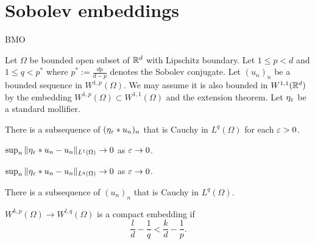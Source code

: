 \documentclass{../note}
\begin{document}
\section{Sobolev embeddings}
\begin{prb}
\end{prb}
\begin{prb}
\end{prb}
\begin{prb}
\end{prb}
\begin{prb} BMO
\end{prb}
\begin{prb}
Let $\Omega$ be bounded open subset of $\mathbb{R}^d$ with Lipschitz boundary.
Let $1\le p<d$ and $1\le q<p^*$ where $p^*:=\frac{dp}{d-p}$ denotes the Sobolev conjugate.
Let $(u_n)_n$ be a bounded sequence in $W^{1,p}(\Omega)$.
We may assume it is also bounded in $W^{1,1}(\mathbb{R}^d)$ by the embedding $W^{1,p}(\Omega)\subset W^{1,1}(\Omega)$ and the extension theorem.
Let $\eta_\varepsilon$ be a standard mollifier.
\begin{parts}
\item There is a subsequence of $(\eta_\varepsilon*u_n)_n$ that is Cauchy in $L^q(\Omega)$ for each $\varepsilon>0$.
\item $\sup_n\|\eta_\varepsilon*u_n-u_n\|_{L^1(\Omega)}\to0$ as $\varepsilon\to0$.
\item $\sup_n\|\eta_\varepsilon*u_n-u_n\|_{L^q(\Omega)}\to0$ as $\varepsilon\to0$.
\item There is a subsequence of $(u_n)_n$ that is Cauchy in $L^q(\Omega)$.
\item $W^{k,p}(\Omega)\to W^{l,q}(\Omega)$ is a compact embedding if
\[\frac ld-\frac1q<\frac kd-\frac1p.\]
\end{parts}
\end{prb}
\end{document}
